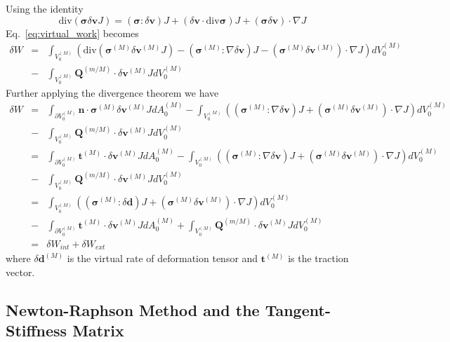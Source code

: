 \documentclass[12pt,aps,pre]{revtex4}
\begin{document}
Using the identity
%
\begin{equation}
\text{div}(\pmb{\sigma}\delta\pmb{v} J) =  (\pmb{\sigma}:\delta\pmb{v})J + (\delta \pmb{v} \cdot \text{div}\pmb{\sigma})J + (\pmb{\sigma} \delta\pmb{v})\cdot \nabla J
\end{equation}
%
Eq.\ \eqref{eq:virtual_work} becomes
%
\begin{eqnarray}
\delta W &=& \int_{V_0^{(M)}} \left(\text{div}(\pmb{\sigma}^{(M)} \delta\pmb{v}^{(M)} J) - (\pmb{\sigma}^{(M)}:\nabla \delta \pmb{v}) J - (\pmb{\sigma}^{(M)}\delta \pmb{v}^{(M)})\cdot \nabla J \right)dV_0^{(M)} \nonumber\\
%
&-& \int_{V_0^{(M)}} \pmb{Q}^{(m/M)} \cdot \delta \pmb{v}^{(M)}J dV_0^{(M)} 
%
\end{eqnarray}
%
Further applying the divergence theorem we have
%
\begin{eqnarray}
\delta W &=& \int_{\partial V_0^{(M)}} \pmb{n} \cdot \pmb{\sigma}^{(M)} \delta\pmb{v}^{(M)} J dA_0^{(M)} - \int_{V_0^{(M)}} \left((\pmb{\sigma}^{(M)}:\nabla \delta \pmb{v}) J + (\pmb{\sigma}^{(M)}\delta \pmb{v}^{(M)})\cdot \nabla J \right)dV_0^{(M)} \nonumber\\
%
&-& \int_{V_0^{(M)}} \pmb{Q}^{(m/M)} \cdot \delta \pmb{v}^{(M)}J dV_0^{(M)} \nonumber\\
%
&=& \int_{\partial V_0^{(M)}} \pmb{t}^{(M)} \cdot \delta\pmb{v}^{(M)} J dA_0^{(M)} - \int_{V_0^{(M)}} \left((\pmb{\sigma}^{(M)}:\nabla \delta \pmb{v}) J + (\pmb{\sigma}^{(M)}\delta \pmb{v}^{(M)})\cdot \nabla J \right)dV_0^{(M)} \nonumber\\
%
&-& \int_{V_0^{(M)}} \pmb{Q}^{(m/M)} \cdot \delta \pmb{v}^{(M)}J dV_0^{(M)} \nonumber\\
&=& \int_{V_0^{(M)}} \left((\pmb{\sigma}^{(M)}:\delta \pmb{d}) J + (\pmb{\sigma}^{(M)}\delta \pmb{v}^{(M)})\cdot \nabla J \right)dV_0^{(M)} \nonumber\\
%
&-& \int_{\partial V_0^{(M)}} \pmb{t}^{(M)} \cdot \delta\pmb{v}^{(M)} J dA_0^{(M)} + \int_{V_0^{(M)}} \pmb{Q}^{(m/M)} \cdot \delta \pmb{v}^{(M)}J dV_0^{(M)} \nonumber\\
%
&=& \delta W_{int} + \delta W_{ext}
\label{eq:virtual_work_final}
\end{eqnarray}
%
where $\delta \pmb{d}^{(M)}$ is the virtual rate of deformation tensor and $\pmb{t}^{(M)}$ is the traction vector.

\subsection{Newton-Raphson Method and the Tangent-Stiffness Matrix}
\end{document}
